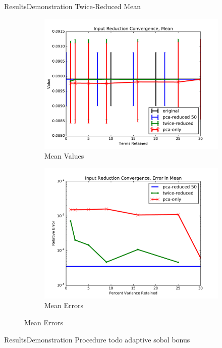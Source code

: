 \documentclass{beamer}
\begin{document}
\begin{frame}{Results}{Demonstration Twice-Reduced Mean}\vspace{-30pt}
  \begin{figure}[h!]
    \centering
    \begin{subfigure}[b]{0.49\textwidth}
      \includegraphics[width=\textwidth]{graphics/mean}
      \caption{Mean Values}
      \label{twice 9v mean val}
    \end{subfigure}
    \begin{subfigure}[b]{0.49\textwidth}
      \includegraphics[width=\textwidth]{graphics/mean_err}
      \caption{Mean Errors}
      \label{twice 9v mean err}
    \end{subfigure}
  \end{figure}
\end{frame}

\begin{frame}{Results}{Demonstration Procedure}\vspace{-30pt}
  todo adaptive sobol bonus
\end{frame}
\end{document}
